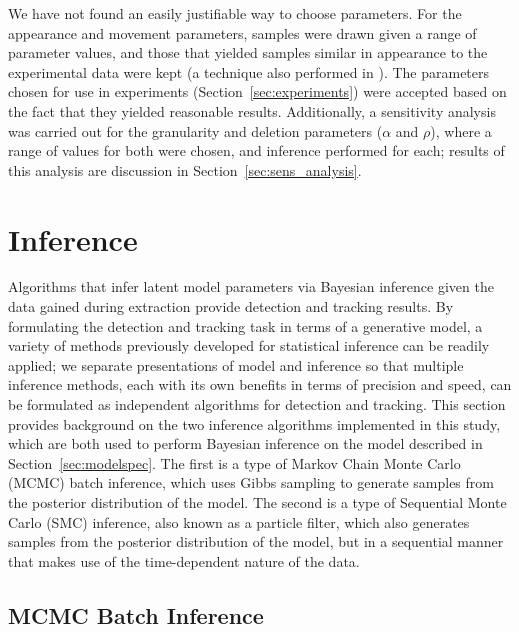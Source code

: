 \documentclass[smallcondensed, final]{svjour3}
\begin{document}
We have not found an easily justifiable way to choose parameters. For the appearance and movement parameters, samples were drawn given a range of parameter values, and those that yielded samples similar in appearance to the experimental data were kept (a technique also performed in \cite{gasthaus_thesis}). The parameters chosen for use in experiments (Section~\ref{sec:experiments}) were accepted based on the fact that they yielded reasonable results. Additionally, a sensitivity analysis was carried out for the granularity and deletion parameters ($\alpha$ and $\rho$), where a range of values for both were chosen, and inference performed for each; results of this analysis are discussion in Section~\ref{sec:sens_analysis}.





\section{Inference}
\label{sec:inference}
Algorithms that infer latent model parameters via Bayesian inference given the data gained during extraction provide detection and tracking results. By formulating the detection and tracking task in terms of a generative model, a variety of methods previously developed for statistical inference can be readily applied; we separate presentations of model and inference so that multiple inference methods, each with its own benefits in terms of precision and speed, can be formulated as independent algorithms for detection and tracking. This section provides background on the two inference algorithms implemented in this study, which are both used to perform Bayesian inference on the model described in Section~\ref{sec:modelspec}. The first is a type of Markov Chain Monte Carlo (MCMC) batch inference, which uses Gibbs sampling to generate samples from the posterior distribution of the model. The second is a type of Sequential Monte Carlo (SMC) inference, also known as a particle filter, which also generates samples from the posterior distribution of the model, but in a sequential manner that makes use of the time-dependent nature of the data.






\subsection{MCMC Batch Inference}
\label{sec:MCMC}
\end{document}
